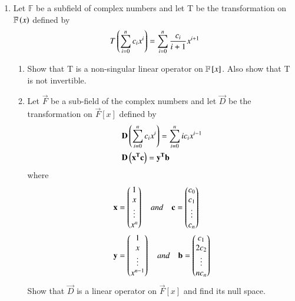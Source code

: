 \begin{enumerate}[label=\thesubsection.\arabic*.,ref=\thesubsection.\theenumi]
%
\\
\solution

\item Let $\mathbb{F}$ be a subfield of complex numbers and let T be the transformation on $\mathbb{F}\left(x\right)$ defined by
\begin{align}
T\left(\sum \limits_{i=0}^n c_i x^i\right)=\sum \limits_{i=0}^n \frac{c_i}{i+1} x^{i+1}\label{q}
\end{align}
\begin{enumerate}
\item  Show that T is a non-singular linear operator on $\mathbb{F}{}\left[x\right]$. Also show that T is not invertible.
\\
\solution

\item Let $\vec{F}$ be a sub-field of the complex numbers and let $\vec{D}$ be the transformation on $\vec{F}[x]$ defined by
\begin{align}
& \mathbf{D}\left(\sum_{i=0}^{n}c_ix^{i}\right) = \sum_{i=0}^{n}ic_ix^{i-1} \label{eq:solutions/4/1/9/b/1} \\
& \mathbf{D}\left(\mathbf{x^Tc}\right) = \mathbf{y^{T}b}
\end{align}
where
\begin{align}
& \mathbf{x} = \begin{pmatrix}1 \\ x \\ \vdots \\ x^n\end{pmatrix} \quad and \quad \mathbf{c} =\begin{pmatrix}c_0 \\ c_1 \\ \vdots \\ c_n\end{pmatrix} \\
& \mathbf{y} = \begin{pmatrix}1 \\ x \\ \vdots \\ x^{n-1}\end{pmatrix} \quad and \quad  \mathbf{b} = \begin{pmatrix}c_1 \\ 2c_2 \\ \vdots \\ nc_n\end{pmatrix}
\end{align}
Show that $\vec{D}$ is a linear operator on $\vec{F}[x]$ and find its null space.
%
\\
\solution

\end{enumerate}
\end{enumerate}
